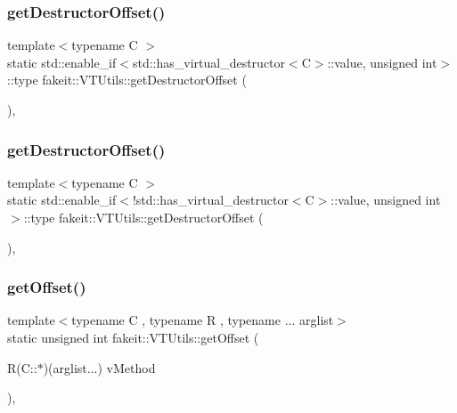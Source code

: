 \subsubsection{\texorpdfstring{getDestructorOffset()}{getDestructorOffset()}\hspace{0.1cm}{\footnotesize\ttfamily [17/18]}}
{\footnotesize\ttfamily template$<$typename C $>$ \\
static std\+::enable\+\_\+if$<$std\+::has\+\_\+virtual\+\_\+destructor$<$C$>$\+::value, unsigned int$>$\+::type fakeit\+::\+V\+T\+Utils\+::get\+Destructor\+Offset (\begin{DoxyParamCaption}{ }\end{DoxyParamCaption})\hspace{0.3cm}{\ttfamily [inline]}, {\ttfamily [static]}}

\mbox{\label{classfakeit_1_1VTUtils_ac13eea89df8b1656a1bedb9a9bb5c518}} 
\subsubsection{\texorpdfstring{getDestructorOffset()}{getDestructorOffset()}\hspace{0.1cm}{\footnotesize\ttfamily [18/18]}}
{\footnotesize\ttfamily template$<$typename C $>$ \\
static std\+::enable\+\_\+if$<$!std\+::has\+\_\+virtual\+\_\+destructor$<$C$>$\+::value, unsigned int$>$\+::type fakeit\+::\+V\+T\+Utils\+::get\+Destructor\+Offset (\begin{DoxyParamCaption}{ }\end{DoxyParamCaption})\hspace{0.3cm}{\ttfamily [inline]}, {\ttfamily [static]}}

\mbox{\label{classfakeit_1_1VTUtils_a0e019646d770355889228b1d88675530}} 
\subsubsection{\texorpdfstring{getOffset()}{getOffset()}\hspace{0.1cm}{\footnotesize\ttfamily [1/9]}}
{\footnotesize\ttfamily template$<$typename C , typename R , typename ... arglist$>$ \\
static unsigned int fakeit\+::\+V\+T\+Utils\+::get\+Offset (\begin{DoxyParamCaption}\item[{R(C\+::$\ast$)(arglist...)}]{v\+Method }\end{DoxyParamCaption})\hspace{0.3cm}{\ttfamily [inline]}, {\ttfamily [static]}}

